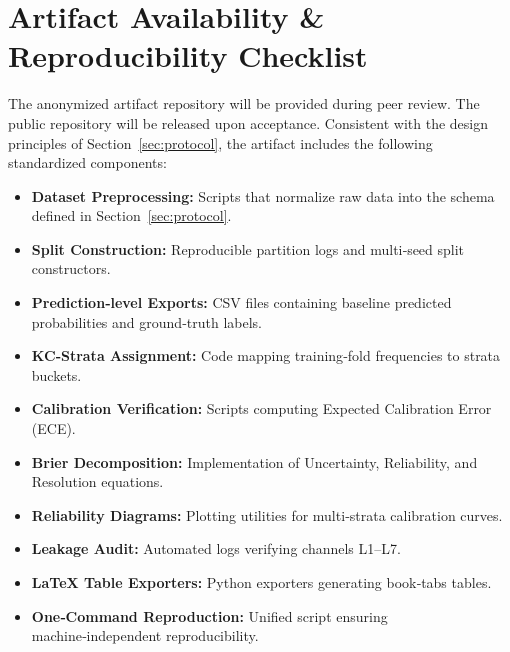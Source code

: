 \documentclass[conference]{IEEEtran}
\begin{document}







\section*{Artifact Availability \& Reproducibility Checklist}
The anonymized artifact repository will be provided during peer review. The public repository will be released upon acceptance. Consistent with the design principles of Section~\ref{sec:protocol}, the artifact includes the following standardized components:
\begin{itemize}
  \item \textbf{Dataset Preprocessing:} Scripts that normalize raw data into the schema defined in Section~\ref{sec:protocol}.
  \item \textbf{Split Construction:} Reproducible partition logs and multi‑seed split constructors.
  \item \textbf{Prediction‑level Exports:} CSV files containing baseline predicted probabilities and ground‑truth labels.
  \item \textbf{KC‑Strata Assignment:} Code mapping training‑fold frequencies to strata buckets.
  \item \textbf{Calibration Verification:} Scripts computing Expected Calibration Error (ECE).
  \item \textbf{Brier Decomposition:} Implementation of Uncertainty, Reliability, and Resolution equations.
  \item \textbf{Reliability Diagrams:} Plotting utilities for multi‑strata calibration curves.
  \item \textbf{Leakage Audit:} Automated logs verifying channels L1--L7.
  \item \textbf{LaTeX Table Exporters:} Python exporters generating book‑tabs tables.
  \item \textbf{One‑Command Reproduction:} Unified script ensuring machine‑independent reproducibility.
\end{itemize}

\appendices




\end{document}
